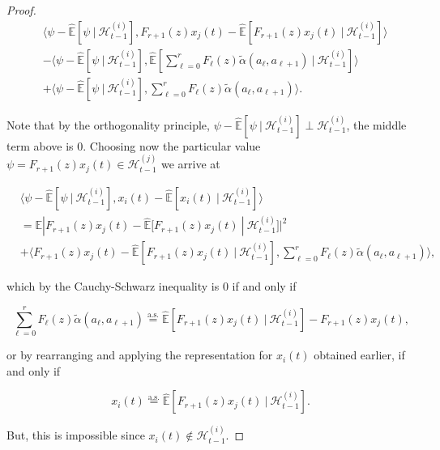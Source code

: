 \documentclass{statsoc}
\def\H{\mathcal{H}}  %
\newcommand{\linE}[2]{\hat{\E}[#1\ |\ #2]}  %
\newcommand{\wtalpha}[2]{\widetilde{\alpha}(#1, #2)}  %
\def\H{\mathcal{H}}  %
\def\E{\mathbb{E}}  %
\newcommand{\inner}[2]{\langle #1, #2 \rangle}  %
\begin{document}
\begin{proof}
  \begin{align*}
    &\inner{\psi - \linE{\psi}{\H_{t - 1}^{(i)}}}{F_{r + 1}(z)x_j(t) - \linE{F_{r + 1}(z)x_j(t)}{\H_{t - 1}^{(i)}}}\\
    &- \inner{\psi - \linE{\psi}{\H_{t - 1}^{(i)}}}{\linE{\sum_{\ell = 0}^r F_\ell(z)\wtalpha{a_\ell}{a_{\ell + 1}}}{\H_{t - 1}^{(i)}}}\\
    &+ \inner{\psi - \linE{\psi}{\H_{t - 1}^{(i)}}}{\sum_{\ell = 0}^r F_\ell(z)\wtalpha{a_\ell}{a_{\ell + 1}}}.
  \end{align*}

  Note that by the orthogonality principle, $\psi - \linE{\psi}{\H_{t - 1}^{(i)}} \perp \H_{t - 1}^{(i)}$, the middle term above is $0$.  Choosing now the particular value $\psi = F_{r + 1}(z)x_j(t) \in \H_{t - 1}^{(j)}$ we arrive at

  \begin{align*}
    &\inner{\psi - \linE{\psi}{\H_{t - 1}^{(i)}}}{x_i(t) - \linE{x_i(t)}{\H_{t - 1}^{(i)}}}\\
    &= \E|F_{r + 1}(z)x_j(t) - \linE{F_{r + 1}(z)x_j(t)}{\H_{t - 1}^{(i)}}|^2\\
    &+ \inner{F_{r + 1}(z)x_j(t) - \linE{F_{r + 1}(z)x_j(t)}{\H_{t - 1}^{(i)}}}{\sum_{\ell = 0}^r F_\ell(z) \wtalpha{a_\ell}{a_{\ell + 1}}},
  \end{align*}

  which by the Cauchy-Schwarz inequality is $0$ if and only if

  \begin{equation*}
    \sum_{\ell = 0}^r F_\ell(z) \wtalpha{a_\ell}{a_{\ell + 1}} \overset{\text{a.s.}}{=} \linE{F_{r + 1}(z)x_j(t)}{\H_{t - 1}^{(i)}} - F_{r + 1}(z)x_j(t),
  \end{equation*}

  or by rearranging and applying the representation for $x_i(t)$
  obtained earlier, if and only if

  \begin{equation*}
    x_i(t) \overset{\text{a.s.}}{=} \linE{F_{r + 1}(z)x_j(t)}{\H_{t - 1}^{(i)}}.
  \end{equation*}

  But, this is impossible since $x_i(t) \not \in \H_{t - 1}^{(i)}$.
\end{proof}
\end{document}
